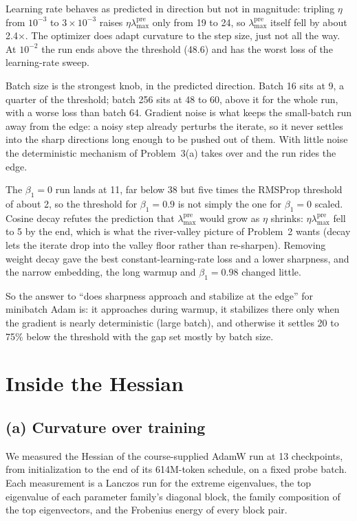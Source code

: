 \documentclass[10pt,letterpaper]{article}
\newcommand{\lmax}{\lambda_{\max}}
\begin{document}
Learning rate behaves as predicted in direction but not in magnitude: tripling $\eta$ from $10^{-3}$ to $3\times10^{-3}$ raises $\eta\lmax^{\mathrm{pre}}$ only from 19 to 24, so $\lmax^{\mathrm{pre}}$ itself fell by about 2.4$\times$. The optimizer does adapt curvature to the step size, just not all the way. At $10^{-2}$ the run ends above the threshold (48.6) and has the worst loss of the learning-rate sweep.

Batch size is the strongest knob, in the predicted direction. Batch 16 sits at 9, a quarter of the threshold; batch 256 sits at 48 to 60, above it for the whole run, with a worse loss than batch 64. Gradient noise is what keeps the small-batch run away from the edge: a noisy step already perturbs the iterate, so it never settles into the sharp directions long enough to be pushed out of them. With little noise the deterministic mechanism of Problem~3(a) takes over and the run rides the edge.

The $\beta_1=0$ run lands at 11, far below 38 but five times the RMSProp threshold of about 2, so the threshold for $\beta_1=0.9$ is not simply the one for $\beta_1=0$ scaled. Cosine decay refutes the prediction that $\lmax^{\mathrm{pre}}$ would grow as $\eta$ shrinks: $\eta\lmax^{\mathrm{pre}}$ fell to 5 by the end, which is what the river-valley picture of Problem~2 wants (decay lets the iterate drop into the valley floor rather than re-sharpen). Removing weight decay gave the best constant-learning-rate loss and a lower sharpness, and the narrow embedding, the long warmup and $\beta_1=0.98$ changed little.

So the answer to ``does sharpness approach and stabilize at the edge'' for minibatch Adam is: it approaches during warmup, it stabilizes there only when the gradient is nearly deterministic (large batch), and otherwise it settles 20 to 75\% below the threshold with the gap set mostly by batch size.



\section{Inside the Hessian}

\subsection*{(a) Curvature over training}

We measured the Hessian of the course-supplied AdamW run at 13 checkpoints, from initialization to the end of its 614M-token schedule, on a fixed probe batch. Each measurement is a Lanczos run for the extreme eigenvalues, the top eigenvalue of each parameter family's diagonal block, the family composition of the top eigenvectors, and the Frobenius energy of every block pair.
\end{document}
